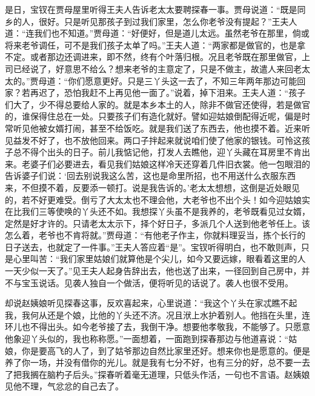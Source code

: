\begin{parag}
    是日，宝钗在贾母屋里听得王夫人告诉老太太要聘探春一事。贾母说道：“既是同乡的人，很好。只是听见那孩子到过我们家里，怎么你老爷没有提起？”王夫人道：“连我们也不知道。”贾母道：“好便好，但是道儿太远。虽然老爷在那里，倘或将来老爷调任，可不是我们孩子太单了吗。”王夫人道：“两家都是做官的，也是拿不定。或者那边还调进来，即不然，终有个叶落归根。况且老爷既在那里做官，上司已经说了，好意思不给么？想来老爷的主意定了，只是不做主，故遣人来回老太太的。”贾母道：“你们愿意更好。只是三丫头这一去了，不知三年两年那边可能回家？若再迟了，恐怕我赶不上再见他一面了。”说着，掉下泪来。王夫人道：“孩子们大了，少不得总要给人家的。就是本乡本土的人，除非不做官还使得，若是做官的，谁保得住总在一处。只要孩子们有造化就好。譬如迎姑娘倒配得近呢，偏是时常听见他被女婿打闹，甚至不给饭吃。就是我们送了东西去，他也摸不着。近来听见益发不好了，也不放他回来。两口子拌起来就说咱们使了他家的银钱。可怜这孩子总不得个出头的日子。前儿我惦记他，打发人去瞧他，迎丫头藏在耳房里不肯出来。老婆子们必要进去，看见我们姑娘这样冷天还穿着几件旧衣裳。他一包眼泪的告诉婆子们说：‘回去别说我这么苦，这也是命里所招，也不用送什么衣服东西来，不但摸不着，反要添一顿打。说是我告诉的。’老太太想想，这倒是近处眼见的，若不好更难受。倒亏了大太太也不理会他，大老爷也不出个头！如今迎姑娘实在比我们三等使唤的丫头还不如。我想探丫头虽不是我养的，老爷既看见过女婿，定然是好才许的。只请老太太示下，择个好日子，多派几个人送到他老爷任上。该怎么着，老爷也不肯将就。”贾母道：“有他老子作主，你就料理妥当，拣个长行的日子送去，也就定了一件事。”王夫人答应着“是”。宝钗听得明白，也不敢则声，只是心里叫苦：“我们家里姑娘们就算他是个尖儿，如今又要远嫁，眼看着这里的人一天少似一天了。”见王夫人起身告辞出去，他也送了出来，一径回到自己房中，并不与宝玉说话。见袭人独自一个做活，便将听见的话说了。袭人也很不受用。
\end{parag}


\begin{parag}
    却说赵姨娘听见探春这事，反欢喜起来，心里说道：“我这个丫头在家忒瞧不起我，我何从还是个娘，比他的丫头还不济。况且洑上水护着别人。他挡在头里，连环儿也不得出头。如今老爷接了去，我倒干净。想要他孝敬我，不能够了。只愿意他象迎丫头似的，我也称称愿。”一面想着，一面跑到探春那边与他道喜说：“姑娘，你是要高飞的人了，到了姑爷那边自然比家里还好。想来你也是愿意的。便是养了你一场，并没有借你的光儿。就是我有七分不好，也有三分的好，总不要一去了把我搁在脑杓子后头。”探春听着毫无道理，只低头作活，一句也不言语。赵姨娘见他不理，气忿忿的自己去了。
\end{parag}


